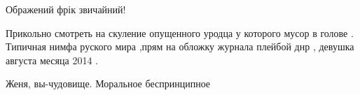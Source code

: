 \begin{itemize}
 
Ображений фрік звичайний!

 

Прикольно смотреть на скуление опущенного уродца у которого мусор в голове .
Типичная нимфа руского мира ,прям на обложку журнала плейбой днр , девушка
августа месяца 2014 .


 
Женя, вы-чудовище. Моральное беспринципное
 

\end{itemize}

